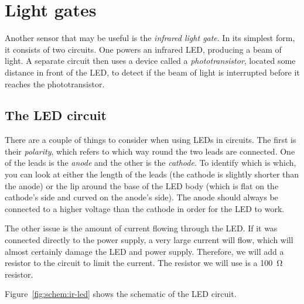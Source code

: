 \documentclass{article}
\begin{document}


\newpage

\section{Light gates}


Another sensor that may be useful is the \emph{infrared light gate}. In its
simplest form, it consists of two circuits. One powers an infrared LED,
producing a beam of light. A separate circuit then uses a device called a
\emph{phototransistor}, located some distance in front of the LED, to detect if
the beam of light is interrupted before it reaches the phototransistor.

\subsection{The LED circuit}

There are a couple of things to consider when using LEDs in circuits. The first
is their \emph{polarity}, which refers to which way round the two leads are
connected. One of the leads is the \emph{anode} and the other is the
\emph{cathode}. To identify which is which, you can look at either the length of
the leads (the cathode is slightly shorter than the anode) or the lip around the
base of the LED body (which is flat on the cathode's side and curved on the
anode's side). The anode should always be connected to a higher voltage than the
cathode in order for the LED to work.

The other issue is the amount of current flowing through the LED. If it was
connected directly to the power supply, a very large current will flow, which
will almost certainly damage the LED and power supply. Therefore, we will add a
resistor to the circuit to limit the current. The resistor we will use is a
\SI{100}{\ohm} resistor.

Figure~\ref{fig:schem:ir-led} shows the schematic of the LED circuit.
\end{document}
